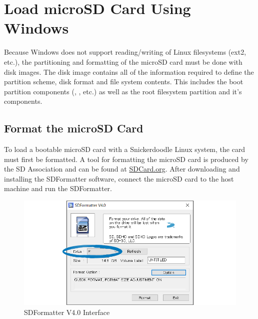 %
%



\section{Load microSD Card Using Windows}

Because Windows does not support reading/writing of Linux filesystems (ext2, etc.), the partitioning and formatting of the microSD card must be done with disk images. The disk image contains all of the information required to define the partition scheme, disk format and file system contents. This includes the boot partition components (, , etc.) as well as the root filesystem partition and it's components.


\subsection{Format the microSD Card}


To load a bootable microSD card with a Snickerdoodle Linux system, the card must first be formatted. A tool for formatting the microSD card is produced by the SD Association and can be found at \href{https://www.sdcard.org/downloads/formatter_4}{SDCard.org}. After downloading and installing the SDFormatter software, connect the microSD card to the host machine and run the SDFormatter. \\


\begin{figure}
	\centering
	\includegraphics{images/SDFormatter.png}
	\caption{SDFormatter V4.0 Interface}
\end{figure}


